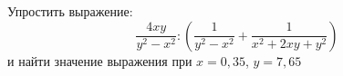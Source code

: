 \begin{ex}
	\begin{condition}
		Упростить выражение:
		\[ \dfrac{4xy}{y^2-x^2}:\left( \dfrac{1}{y^2-x^2}+\dfrac{1}{x^2+2xy+y^2} \right) \]
		и найти значение выражения при \( x=0,35 \), \( y=7,65 \)
	\end{condition}
\end{ex}